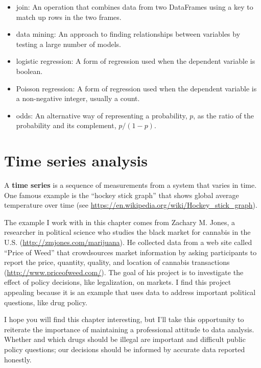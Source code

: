 \documentclass[12pt]{book}
\theoremstyle{exercise}
\begin{document}
\begin{itemize}
\item join: An operation that combines data from two DataFrames
using a key to match up rows in the two frames.%
%

\item data mining: An approach to finding relationships between
variables by testing a large number of models.%

\item logistic regression: A form of regression used when the
dependent variable is boolean.%

\item Poisson regression: A form of regression used when the
dependent variable is a non-negative integer, usually a count.%

\item odds: An alternative way of representing a probability, $p$, as
  the ratio of the probability and its complement, $p / (1-p)$.%

\end{itemize}



\chapter{Time series analysis}

A {\bf time series} is a sequence of measurements from a system that
varies in time.  One famous example is the ``hockey stick graph'' that
shows global average temperature over time (see
\url{https://en.wikipedia.org/wiki/Hockey_stick_graph}).%
%

The example I work with in this chapter comes from Zachary M. Jones, a
researcher in political science who studies the black market for
cannabis in the U.S.  (\url{http://zmjones.com/marijuana}).  He
collected data from a web site called ``Price of Weed'' that
crowdsources market information by asking participants to report the
price, quantity, quality, and location of cannabis transactions
(\url{http://www.priceofweed.com/}).  The goal of his project is to
investigate the effect of policy decisions, like legalization, on
markets.  I find this project appealing because it is an example that
uses data to address important political questions, like drug policy.%
%

I hope you will
find this chapter interesting, but I'll take this opportunity to
reiterate the importance of maintaining a professional attitude to
data analysis.  Whether and which drugs should be illegal are
important and difficult public policy questions; our decisions should
be informed by accurate data reported honestly.%
\end{document}
